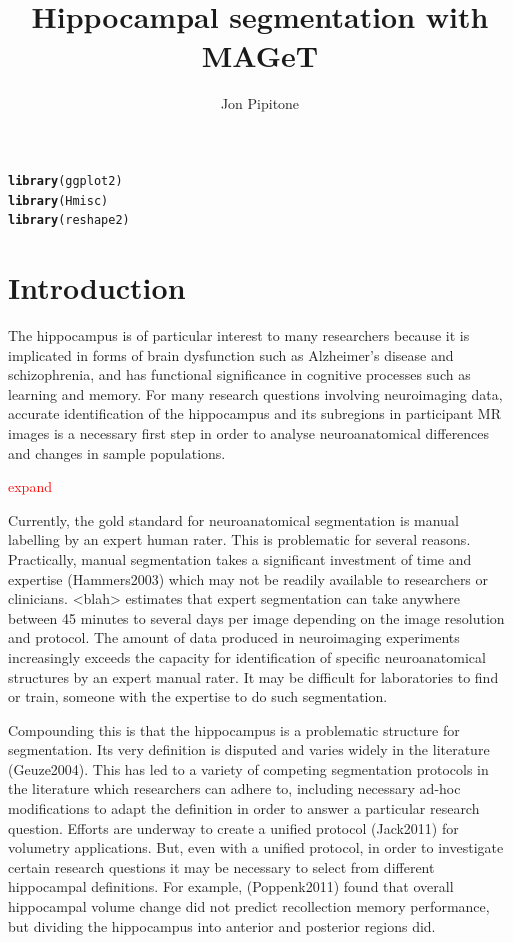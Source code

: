 \documentclass{article}\usepackage{graphicx, color}
\makeatletter
\newcommand{\hlfunctioncall}[1]{\textcolor[rgb]{0.501960784313725,0,0.329411764705882}{\textbf{#1}}}%
\newenvironment{kframe}{%
 \def\at@end@of@kframe{}%
 \ifinner\ifhmode%
  \def\at@end@of@kframe{\end{minipage}}%
  \begin{minipage}{\columnwidth}%
 \fi\fi%
 \def\FrameCommand##1{\hskip\@totalleftmargin \hskip-\fboxsep
 \colorbox{shadecolor}{##1}\hskip-\fboxsep
     \hskip-\linewidth \hskip-\@totalleftmargin \hskip\columnwidth}%
 \MakeFramed {\advance\hsize-\width
   \@totalleftmargin\z@ \linewidth\hsize
   \@setminipage}}%
 {\par\unskip\endMakeFramed%
 \at@end@of@kframe}
\newenvironment{knitrout}{}{} %
\newcommand{\todo}[1]{
    \addcontentsline{tdo}{todo}{\protect{#1}}
    \textcolor{red}{#1}
}
\makeatother
\begin{document}
\begin{knitrout}
\color{fgcolor}\begin{kframe}
\begin{alltt}
\hlfunctioncall{library}(ggplot2)
\hlfunctioncall{library}(Hmisc)
\hlfunctioncall{library}(reshape2)
\end{alltt}
\end{kframe}
\end{knitrout}


\title{Hippocampal segmentation with MAGeT}
\author{Jon Pipitone}
\maketitle

\section{Introduction}


The hippocampus is of particular interest to many researchers because it is implicated in forms of brain dysfunction such as Alzheimer's disease and schizophrenia, and has functional significance in cognitive processes such as learning and memory.  For many research questions involving neuroimaging data, accurate identification of the hippocampus and its subregions in participant MR images is a necessary first step in order to analyse neuroanatomical differences and changes in  sample populations.  \todo{expand}

Currently, the gold standard for neuroanatomical segmentation is manual labelling by an expert human rater.  This is problematic for several reasons.  Practically, manual segmentation takes a significant investment of time and expertise (Hammers2003) which may not be readily available to researchers or clinicians.  <blah> estimates that expert segmentation can take anywhere between 45 minutes to several days per image depending on the image resolution and protocol.  The amount of data produced in neuroimaging experiments increasingly exceeds the capacity for identification of specific neuroanatomical structures by an expert manual rater.  It may be difficult for laboratories to find or train, someone with the expertise to do such segmentation.  

Compounding this is that the hippocampus is a problematic structure for segmentation. Its very definition is disputed and varies widely in the literature (Geuze2004).  This has led to a variety of competing segmentation protocols in the literature which researchers can adhere to, including necessary ad-hoc modifications to adapt the definition in order to answer a particular research question.  Efforts are underway to create a unified protocol (Jack2011) for volumetry applications. But, even with a unified protocol, in order to investigate certain research questions it may be necessary to select from different hippocampal definitions. For example, (Poppenk2011) found that overall hippocampal volume change did not predict recollection memory performance, but dividing the hippocampus into anterior and posterior regions did. 
\end{document}
